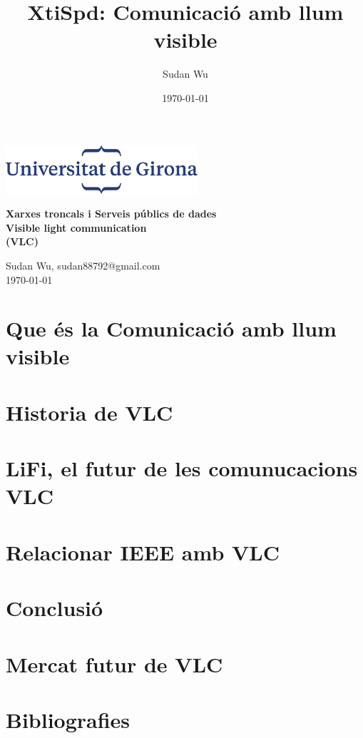 \documentclass[10pt,a4paper]{article}
\title{XtiSpd: Comunicació amb llum visible}
\author{Sudan Wu}
\date{\today}
\begin{document}
\begin{titlepage}
    \begin{center}
        \includegraphics[height=1.8cm]{logoUdG}\\\vfill
    \end{center}
    \center
    {\huge \bfseries Xarxes troncals i Serveis públics de dades}\\[0.5cm]
    {\Huge \bfseries Visible light communication} \\[0.5cm]
    {\Huge \bfseries (VLC)} \\[0.5cm]

    \vfill
    \begin{center} \large
        {Sudan Wu, sudan88792@gmail.com} \\[0.25cm]
        {\today}\\ [1cm]
    \end{center}

\end{titlepage}

\tableofcontents

\clearpage

\section{Que és la Comunicació amb llum visible}


\section{Historia de VLC}


\section{LiFi, el futur de les comunucacions VLC}



\section{Relacionar IEEE amb VLC}

\section{Conclusió}


\section{Mercat futur de VLC}

\clearpage

\section{Bibliografies}

\clearpage
\end{document}

